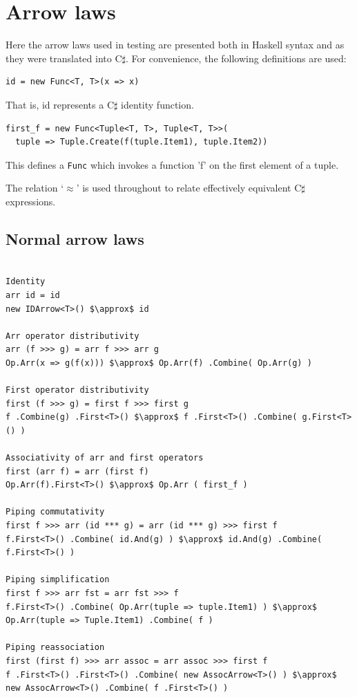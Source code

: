 \documentclass[12pt,twoside,notitlepage]{report}
\begin{document}





\appendix

\chapter{Arrow laws} \label{sec:arrow_laws}

Here the arrow laws used in testing are presented both in Haskell syntax and as they were translated into C$\sharp$. For convenience, the following definitions are used:

\begin{lstlisting}
id = new Func<T, T>(x => x)
\end{lstlisting}

That is, id represents a C$\sharp$ identity function.

\begin{lstlisting}
first_f = new Func<Tuple<T, T>, Tuple<T, T>>(
  tuple => Tuple.Create(f(tuple.Item1), tuple.Item2))
\end{lstlisting}

This defines a \texttt{Func} which invokes a function 'f' on the first element of a tuple.

The relation `$\approx$' is used throughout to relate effectively equivalent C$\sharp$ expressions.

\section{Normal arrow laws} \label{sec:simle_arrow_laws}

\begin{samepage}
\begin{lstlisting}[mathescape]

Identity
arr id = id
new IDArrow<T>() $\approx$ id

Arr operator distributivity
arr (f >>> g) = arr f >>> arr g
Op.Arr(x => g(f(x))) $\approx$ Op.Arr(f) .Combine( Op.Arr(g) )

First operator distributivity
first (f >>> g) = first f >>> first g
f .Combine(g) .First<T>() $\approx$ f .First<T>() .Combine( g.First<T>() )

Associativity of arr and first operators
first (arr f) = arr (first f)
Op.Arr(f).First<T>() $\approx$ Op.Arr ( first_f )

Piping commutativity
first f >>> arr (id *** g) = arr (id *** g) >>> first f
f.First<T>() .Combine( id.And(g) ) $\approx$ id.And(g) .Combine( f.First<T>() )

Piping simplification
first f >>> arr fst = arr fst >>> f
f.First<T>() .Combine( Op.Arr(tuple => tuple.Item1) ) $\approx$ Op.Arr(tuple => Tuple.Item1) .Combine( f )

Piping reassociation
first (first f) >>> arr assoc = arr assoc >>> first f
f .First<T>() .First<T>() .Combine( new AssocArrow<T>() ) $\approx$ new AssocArrow<T>() .Combine( f .First<T>() )

\end{lstlisting}
\end{samepage}
\end{document}
